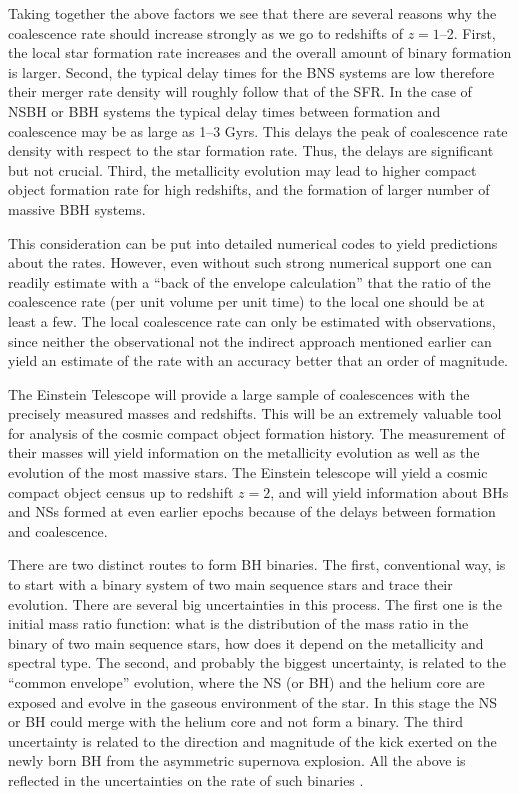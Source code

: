 

Taking together the above factors we see that there are several reasons why the coalescence rate should increase strongly as we go to redshifts of $z=1$--2. First, the local star formation rate increases and the overall amount of binary formation is larger. Second, the typical delay times for the BNS systems are low therefore their merger rate density will roughly follow that of the SFR. In the case of NSBH or BBH systems the typical delay times between formation and coalescence may be as large as 1--3 Gyrs. This delays the peak of coalescence rate density with respect to the star formation rate. Thus, the delays are significant but not crucial. Third, the metallicity evolution may lead to higher compact object formation rate for high redshifts, and the formation of larger number of massive BBH systems.

This consideration can be put into detailed numerical codes to yield predictions about the rates. However, even without such strong numerical support one can readily estimate with a ``back of the envelope calculation'' that the ratio of the coalescence rate (per unit volume per unit time) to the local one should be at least a few.  The local coalescence rate can only be estimated with observations, since neither the observational not the indirect approach mentioned earlier can yield an estimate of the rate with an accuracy better that an order of magnitude.

The Einstein Telescope will provide a large sample of  coalescences with the precisely measured masses and redshifts.  This will be an extremely valuable tool for analysis of the cosmic compact object formation history.  The measurement of their masses will yield information on the metallicity evolution as well as the evolution of the most massive stars. The Einstein telescope will yield a cosmic compact object census up to redshift $z=2$, and will yield information about BHs and NSs formed at even earlier epochs because of the delays between formation and coalescence.


There are two distinct routes to form BH binaries. %
The first, conventional way, is to start with a binary system of two main sequence stars and trace their
evolution. There are several big uncertainties in this process. The first one
is the initial mass ratio function: what is the distribution of the mass ratio
in the binary of two main sequence stars, how does it depend on the metallicity
and spectral type. The second, and probably the biggest uncertainty, is related
to the ``common envelope'' evolution, where the NS (or BH) and the helium core
are exposed and evolve in the gaseous environment of the star. In this stage
the NS or BH could merge with the helium core %
and not form a binary. The third uncertainty is related to the direction and magnitude of the
kick exerted on the newly born BH from the  asymmetric  supernova  explosion.
All the above is reflected in the uncertainties on the rate of such binaries \cite{LPP:LRR,BB:1999}.


